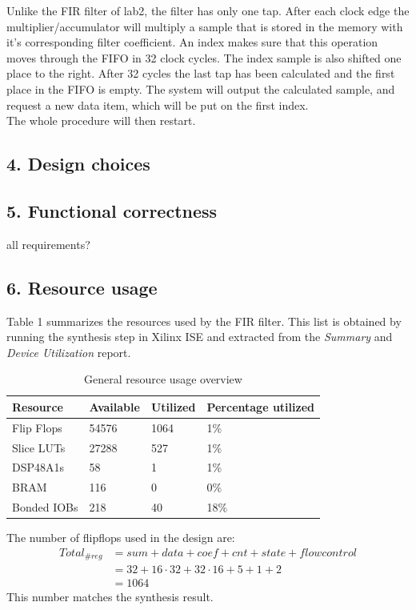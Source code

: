 \documentclass[a4paper,twoside,11pt, fleqn]{article}
\begin{document}
Unlike the FIR filter of lab2, the filter has only one tap. After each clock edge the multiplier/accumulator will multiply a sample that is stored in the memory with it's corresponding filter coefficient. An index makes sure that this operation moves through the FIFO in 32 clock cycles. The index sample is also shifted one place to the right. After 32 cycles the last tap has  been calculated and the first place in the FIFO is empty. The system will output the calculated sample, and request a new data item, which will be put on the first index.\\ 

The whole procedure will then restart.
\subsection*{4. Design choices}

\subsection*{5. Functional correctness}
all requirements?

\subsection*{6. Resource usage}
Table 1 summarizes the resources used by the FIR filter. This list is obtained by running the synthesis step in Xilinx ISE and extracted from the \textit{Summary} and \textit{Device Utilization} report.
\begin{table}[h]
\begin{tabular}{|l|l|l|l|}
\hline
\textbf{Resource} & \textbf{Available} & \textbf{Utilized} & \textbf{Percentage utilized}\\
\hline
Flip Flops	& 54576 & 1064 	& 1\%\\
Slice LUTs 	& 27288 & 527 	& 1\%\\
DSP48A1s	& 58 	& 1 	& 1\%\\
BRAM		& 116 	& 0 	& 0\%\\
Bonded IOBs	& 218 	& 40 	& 18\%\\
\hline
\end{tabular}
\caption{General resource usage overview}
\end{table}

The number of flipflops used in the design are:
\begin{align*}
Total_{\#reg}	&= sum + data + coef + cnt + state + flow control\\
			&= 32 + 16\cdot 32 + 32\cdot 16 + 5 + 1 + 2\\
			&= 1064
\end{align*}
This number matches the synthesis result.\\
\end{document}
